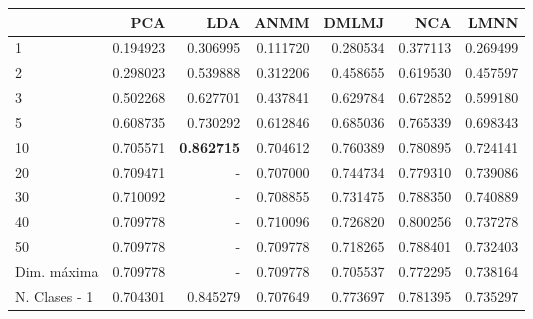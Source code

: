 \begin{tabular}{lrrrrrr}
\toprule
{} &       PCA &       LDA &      ANMM &     DMLMJ &       NCA &      LMNN \\
\midrule
1             &  0.194923 &  0.306995 &  0.111720 &  0.280534 &  0.377113 &  0.269499 \\
2             &  0.298023 &  0.539888 &  0.312206 &  0.458655 &  0.619530 &  0.457597 \\
3             &  0.502268 &  0.627701 &  0.437841 &  0.629784 &  0.672852 &  0.599180 \\
5             &  0.608735 &  0.730292 &  0.612846 &  0.685036 &  0.765339 &  0.698343 \\
10            &  0.705571 &  \textbf{0.862715} &  0.704612 &  0.760389 &  0.780895 &  0.724141 \\
20            &  0.709471 &  -        &  0.707000 &  0.744734 &  0.779310 &  0.739086 \\
30            &  0.710092 &  -        &  0.708855 &  0.731475 &  0.788350 &  0.740889 \\
40            &  0.709778 &  -        &  0.710096 &  0.726820 &  0.800256 &  0.737278 \\
50            &  0.709778 &  -        &  0.709778 &  0.718265 &  0.788401 &  0.732403 \\
Dim. máxima   &  0.709778 &  -        &  0.709778 &  0.705537 &  0.772295 &  0.738164 \\
N. Clases - 1 &  0.704301 &  0.845279 &  0.707649 &  0.773697 &  0.781395 &  0.735297 \\
\bottomrule
\end{tabular}

